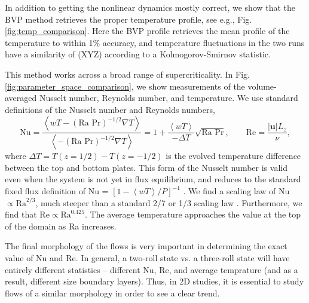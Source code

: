 \documentclass[aps, pre, onecolumn, nofootinbib, notitlepage, groupedaddress, amsfonts, amssymb, amsmath, longbibliography]{revtex4-1}
\newcommand{\angles}[1]{\ensuremath{\left\langle #1 \right\rangle}}
\newcommand{\grad}{\ensuremath{\nabla}}
\begin{document}
In addition to getting the nonlinear dynamics mostly correct, we show that the BVP method retrieves the
proper temperature profile, see e.g., Fig. \ref{fig:temp_comparison}.  Here the BVP profile retrieves the
mean profile of the temperature to within 1\% accuracy, and temperature fluctuations in the two runs
have a similarity of (XYZ) according to a Kolmogorov-Smirnov statistic.

This method works across a broad range of supercriticality.  In Fig. \ref{fig:parameter_space_comparison},
we show measurements of the volume-averaged Nusselt number, Reynolds number, and temperature.
We use standard definitions of the Nusselt number and Reynolds numbers,
\begin{equation}
\text{Nu} = \frac{\angles{wT - (\text{Ra Pr})^{-1/2}\grad T}}{\angles{- (\text{Ra Pr})^{-1/2} \grad T}} =
1 + \frac{\angles{wT}}{-\Delta T}\sqrt{\text{Ra Pr}}, \qquad \text{Re} = \frac{|\bm{u}| L_z}{\nu},
\end{equation}
where $\Delta T = T(z = 1/2) - T(z = -1/2)$ is the evolved temperature difference
between the top and bottom plates.  This form of the Nusselt number is valid even when
the system is not yet in flux equilibrium, and reduces to the standard fixed flux definition
of Nu  = $[1 - \angles{wT} / P]^{-1}$ \cite{johnston&doering2009}. We find a scaling law of
Nu $\propto \text{Ra}^{2/3}$, much steeper than a standard 2/7 or 1/3 scaling law
\cite{johnston&doering2009}. Furthermore, we find that Re$\propto \text{Ra}^{0.425}$. The average temperature
approaches the value at the top of the domain as Ra increases.  

The final morphology of the flows is very important in determining the exact value of Nu and Re.  In general,
a two-roll state vs. a three-roll state will have entirely different statistics -- different Nu, Re, and average
temprature (and as a result, different size boundary layers).  Thus, in 2D studies, it is essential to study flows
of a similar morphology in order to see a clear trend. 
\end{document}
